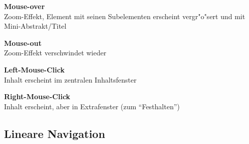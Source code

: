\begin{list_sabina}
        \item \textbf{Mouse-over}\\
        Zoom-Effekt, Element mit seinen Subelementen erscheint
        vergr"o"sert und mit Mini-Abstrakt/Titel
        \item \textbf{Mouse-out}\\
        Zoom-Effekt verschwindet wieder
        \item \textbf{Left-Mouse-Click}\\
        Inhalt erscheint im zentralen Inhaltsfenster
        \item \textbf{Right-Mouse-Click}\\
        Inhalt erscheint, aber in Extrafenster (zum ``Festhalten'')
\end{list_sabina}


\subsection{Lineare Navigation}\label{Lineare Navigation}







